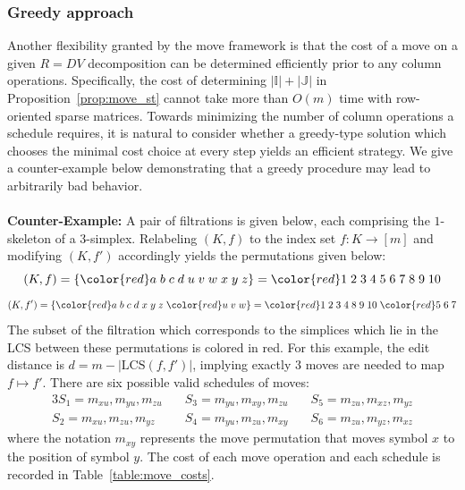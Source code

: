 \documentclass[sn-mathphys]{sn-jnl}
\begin{document}
\subsubsection{Greedy approach}\label{sec:greedy} 
Another flexibility granted by the move framework is that the cost of a move on a given $R = D V$ decomposition can be determined efficiently prior to any column operations. 
Specifically, the cost of determining $\lvert \mathbb{I}\rvert + \lvert \mathbb{J}\rvert$ in Proposition~\ref{prop:move_st} cannot take more than $O(m)$ time with row-oriented sparse matrices. 
Towards minimizing the number of column operations a schedule requires, it is natural to consider whether a greedy-type solution which chooses the minimal cost choice at every step yields an efficient strategy. We give a counter-example below demonstrating that a greedy procedure may lead to arbitrarily bad behavior. 
\\
\\
\textbf{Counter-Example:} A pair of filtrations is given below, each comprising the $1$-skeleton of a $3$-simplex. Relabeling $(K, f)$ to the index set $f : K \to [m]$ and modifying $(K, f')$ accordingly yields the permutations given below: 
$$ (K, f) = \{ {\color{red} a \; b \; c \; d \; u \; v \; w} \; x \; y \; z  \} = { {\color{red} 1 \; 2 \; 3 \; 4 \; 5 \; 6 \; 7 } \; 8 \; 9 \; 10 } $$
$$ (K, f') = \{ {\color{red} a \; b \; c \; d } \; x \; y \; z \; {\color{red} u \; v \; w } \}  = { {\color{red} 1 \; 2 \; 3 \; 4 } \;8 \; 9 \; 10 \; {\color{red} 5 \; 6 \; 7 } }$$
The subset of the filtration which corresponds to the simplices which lie in the LCS between these permutations is colored in red. For this example, the edit distance is 
$d = m - \lvert \mathrm{LCS}(f, f') \rvert$, implying exactly $3$ moves are needed to map $f \mapsto f'$. There are six possible valid schedules of moves: 
\begin{alignat*}{3}
	S_1 = m_{x u}, m_{y u}, m_{z u} \quad & S_3 = m_{y u}, m_{x y}, m_{z u} \quad  & S_5 = m_{z u}, m_{x z}, m_{y z} \\
	S_2 = m_{x u}, m_{z u}, m_{y z} \quad  & S_4 = m_{y u}, m_{z u}, m_{x y} \quad  & S_6 = m_{z u}, m_{y z}, m_{x z} 
\end{alignat*}
where the notation $m_{x y}$ represents the move permutation that moves symbol $x$ to the position of symbol $y$. The cost of each  move operation and each schedule is recorded in Table~\ref{table:move_costs}.
\end{document}
